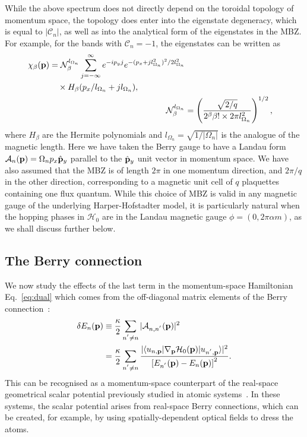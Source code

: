 While the above spectrum does not directly depend on the toroidal
topology of momentum space, the topology does enter into the
eigenstate degeneracy, which is equal to $|\mathcal{C}_n|$, as well as
into the analytical form of the eigenstates in the MBZ. For example,
for the bands with $\mathcal{C}_n = -1$, the eigenstates can be
written as~\cite{price2014magnetic}
%
\begin{align}\label{eq:chi}
\begin{split} \chi_\beta (\mathbf{p}) &= \mathcal{N}_\beta^{l_{\Omega_n}}
\sum_{j = - \infty}^{\infty} e^{- i p_y j } e^{ - ( p_x + j
l_{\Omega_n}^2 ) ^2 / 2 l_{\Omega_n}^2}\\ &\quad \times H_\beta ( p_x
/ l_{\Omega_n} + j l_{\Omega_n}) ,
\end{split}\\ \mathcal{N}_\beta^{l_{\Omega_n}} &= \left(
\frac{\sqrt{2/q}} {2^\beta\beta! \times 2 \pi l_{\Omega_n}^2}
\right)^{1/2} ,
\end{align}
% 
where $H_\beta$ are the Hermite polynomials and $l_{\Omega_n} =
\sqrt{1/|\Omega_n|}$ is the analogue of the magnetic length. Here we
have taken the Berry gauge to have a Landau form
$\mathcal{A}_n(\mathbf{p}) = \Omega_n p_x \hat{\mathbf{p}}_y$ parallel to
the $\hat{\mathbf{p}}_y$ unit vector in momentum space. We have also
assumed that the MBZ is of length $2 \pi$ in one momentum direction,
and $2 \pi / q$ in the other direction, corresponding to a magnetic
unit cell of $q$ plaquettes containing one flux quantum. While this
choice of MBZ is valid in any magnetic gauge of the underlying
Harper-Hofstadter model, it is particularly natural when the hopping
phases in $\mathcal{H}_0$ are in the Landau magnetic gauge $\phi = (0,
2\pi\alpha m)$, as we shall discuss further below.


\subsection{The Berry connection}\label{sec:berry-shift}

We now study the effects of the last term in the momentum-space
Hamiltonian Eq.~\eqref{eq:dual} which comes from the off-diagonal matrix
elements of the Berry connection~\cite{berry}:
\begin{align} \delta E_n(\mathbf{p}) &\equiv
\frac{\kappa}{2}\sum_{n^{'}\neq n}
\vert \mathcal{A}_{n,n^{'}}(\mathbf{p}) \vert^2 \notag \\ &=
\frac{\kappa}{2}\sum_{n^{'}\neq n}
\frac{\vert \langle u_{n,\mathbf{p}} \vert\nabla_{\mathbf{p}}\mathcal{H}_0(\mathbf{p})\vert u_{n^{'},\mathbf{p}} \rangle \vert^2}{\left[E_{n^{'}}(\mathbf{p})
- E_{n}(\mathbf{p})\right]^2}.
  \label{eq:shift}
\end{align} This can be recognised as a momentum-space counterpart of
the real-space geometrical scalar potential previously studied in
atomic systems~\cite{dum:1996, dutta:1999, dalibardrmp2011}. In these
systems, the scalar potential arises from real-space Berry
connections, which can be created, for example, by using
spatially-dependent optical fields to dress the atoms.
 

